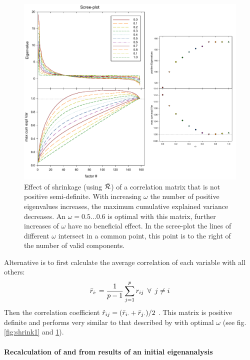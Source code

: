\begin{figure}
   \caption{Effect of shrinkage (using \(\bar{\mathcal{R}} \)) of a correlation matrix that is not positive semi-definite. With increasing \(\omega \) the number of positive eigenvalues increases, the maximum cumulative explained variance decreases. An \(\omega = 0.5\ldots 0.6 \) is optimal with this matrix, further increases of \(\omega \) have no beneficial effect. In the scree-plot the lines of different \(\omega \) intersect in a common point, this point is to the right of the number of valid components.}
   \label{fig:shrink2}
   \centering
      \includegraphics[width=\textwidth]{Graphics/Effect-omega-on-Scree}
\end{figure}

Alternative is to first calculate the average correlation of each variable with all others:
\begin{equation}
   \bar{r}_{i\cdot} = \frac{1}{p-1} \sum_{j=1}^p{r_{ij}} \enspace \forall \enspace j \neq i
\end{equation}
Then the correlation coefficient \(\hat{r}_{ij} = (\bar{r}_{i\cdot} + \bar{r}_{j\cdot}) /2 \) \parencite{Dis-07}. This matrix is positive definite and performs very similar to that described by \parencite{Kwa-11} with optimal \(\omega \) (see fig. \ref{fig:shrink1} and \ref{fig:shrink2}).

\paragraph{Recalculation of  and  from results of an initial eigenanalysis}

